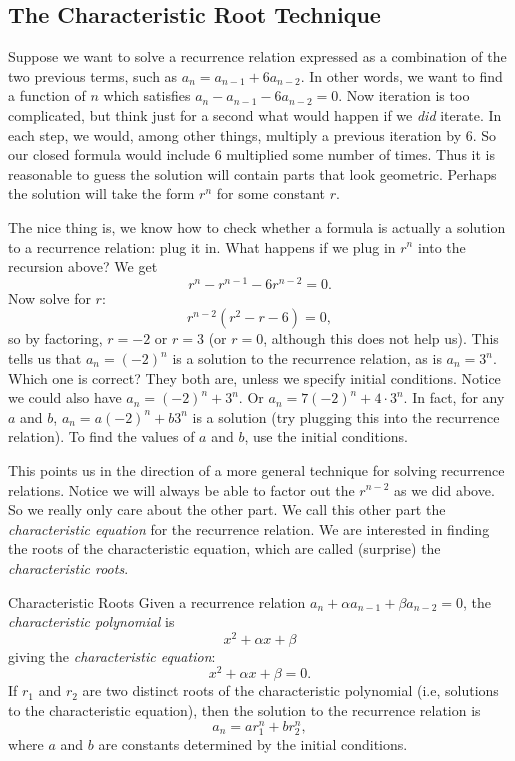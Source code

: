 \documentclass[12pt]{article}
\begin{document}
\subsection{The Characteristic Root Technique}

Suppose we want to solve a recurrence relation expressed as a combination of the two previous terms, such as $a_n = a_{n-1} + 6a_{n-2}$. In other words, we want to find a function of $n$ which satisfies $a_n - a_{n-1} - 6a_{n-2} = 0$.  Now iteration is too complicated, but think just for a second what would happen if we {\em did} iterate.  In each step, we would, among other things, multiply a previous iteration by 6.   So our closed formula would include $6$ multiplied some number of times.  Thus it is reasonable to guess the solution will contain parts that look geometric.  Perhaps the solution will take the form $r^n$ for some constant $r$.

The nice thing is, we know how to check whether a formula is actually a solution to a recurrence relation: plug it in.  What happens if we plug in $r^n$ into the recursion above? We get  \[r^n - r^{n-1} - 6r^{n-2} = 0.\]
Now solve for $r$: \[r^{n-2}(r^2 - r - 6) = 0,\]
so by factoring, $r = -2$ or $r = 3$ (or $r = 0$, although this does not help us).  This tells us that $a_n = (-2)^n$ is a solution to the recurrence relation, as is $a_n = 3^n$.  Which one is correct?  They both are, unless we specify initial conditions.  Notice we could also have $a_n = (-2)^n + 3^n$.  Or $a_n = 7(-2)^n + 4\cdot 3^n$.  In fact, for any $a$ and $b$, $a_n = a(-2)^n + b 3^n$ is a solution (try plugging this into the recurrence relation).  To find the values of $a$ and $b$, use the initial conditions.

This points us in the direction of a more general technique for solving recurrence relations.  Notice we will always be able to factor out the $r^{n-2}$ as we did above.  So we really only care about the other part.  We call this other part the \emph{characteristic equation} for the recurrence relation.  We are interested in finding the roots of the characteristic equation, which are called (surprise) the \emph{characteristic roots}.

\clearpage
\begin{defbox}{Characteristic Roots}
 Given a recurrence relation $a_n + \alpha a_{n-1} + \beta a_{n-2} = 0$, the \emph{characteristic polynomial} is
 \[x^2 + \alpha x + \beta\]
 giving the {\em characteristic equation}:
 \[x^2 + \alpha x + \beta = 0.\]
 If $r_1$ and $r_2$ are two distinct roots of the characteristic polynomial (i.e, solutions to the characteristic equation), then the solution to the recurrence relation is
 \[a_n = ar_1^n + br_2^n,\]
 where $a$ and $b$ are constants determined by the initial conditions.
\end{defbox}
\end{document}
